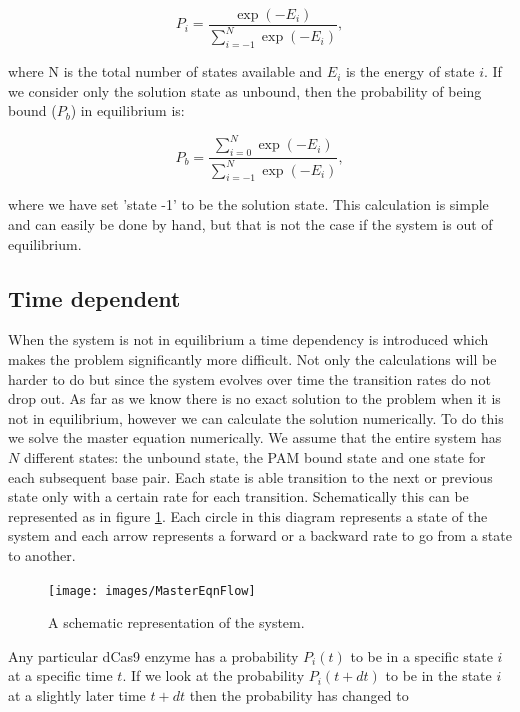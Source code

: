 \begin{equation}
P_i = \frac{\exp{(-E_i)}}{\sum_{i=-1}^{N}\exp{(-E_i)}},
\end{equation}

where N is the total number of states available and $E_i$ is the energy of state $i$. If we consider only the solution state as unbound, then the probability of being bound ($P_b$) in equilibrium is:

\begin{equation}
P_b = \frac{\sum_{i=0}^{N}\exp{(-E_i)}}{\sum_{i=-1}^{N}\exp{(-E_i)}},
\end{equation}

where we have set 'state -1' to be the solution state. This calculation is simple and can easily be done by hand, but that is not the case if the system is out of equilibrium.

\subsection{Time dependent}
\label{sec:TimeDepTheory}

When the system is not in equilibrium a time dependency is introduced which makes the problem significantly more difficult. Not only the calculations will be harder to do but since the system evolves over time the transition rates do not drop out. As far as we know there is no exact solution to the problem when it is not in equilibrium, however we can calculate the solution numerically. To do this we solve the master equation numerically. We assume that the entire system has $N$ different states: the unbound state, the PAM bound state and one state for each subsequent base pair. Each state is able transition to the next or previous state only with a certain rate for each transition. Schematically this can be represented as in figure \ref{fig:mastereqn_schematic}. Each circle in this diagram represents a state of the system and each arrow represents a forward or a backward rate to go from a state to another.

\begin{figure}[H]
\begin{center}
\texttt{[image: images/MasterEqnFlow]}
\label{fig:mastereqn_schematic}
\caption{A schematic representation of the system.}
\end{center}
\end{figure}

Any particular dCas9 enzyme has a probability $P_i(t)$ to be in a specific state $i$ at a specific time  $t$. If we look at the probability $P_i(t+dt)$ to be in the state $i$ at a slightly later time $t+dt$ then the probability has changed to

